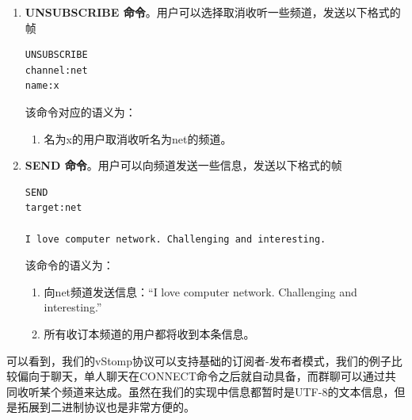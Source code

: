 \documentclass{ctexrep}
\begin{document}
\begin{enumerate}
\begin{enumerate}
		\end{enumerate}
		\item \textbf{UNSUBSCRIBE 命令}。用户可以选择取消收听一些频道，发送以下格式的帧\begin{lstlisting}
UNSUBSCRIBE
channel:net
name:x
		\end{lstlisting}该命令对应的语义为：\begin{enumerate}
			\item 名为x的用户取消收听名为net的频道。
		\end{enumerate}
		\item \textbf{SEND 命令}。用户可以向频道发送一些信息，发送以下格式的帧\begin{lstlisting}
SEND
target:net

I love computer network. Challenging and interesting.
		\end{lstlisting}该命令的语义为：\begin{enumerate}
			\item 向net频道发送信息：“I love computer network. Challenging and interesting.”
			\item 所有收订本频道的用户都将收到本条信息。
		\end{enumerate}
	\end{enumerate}

可以看到，我们的vStomp协议可以支持基础的订阅者-发布者模式，我们的例子比较偏向于聊天，单人聊天在CONNECT命令之后就自动具备，而群聊可以通过共同收听某个频道来达成。虽然在我们的实现中信息都暂时是UTF-8的文本信息，但是拓展到二进制协议也是非常方便的。
\end{document}
